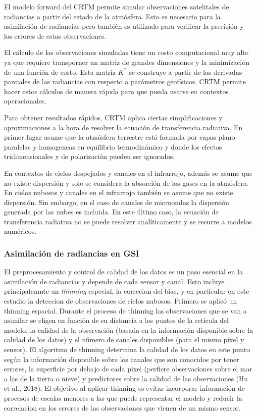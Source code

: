 \documentclass[12pt,oneside,a4paper]{reedthesis}
\begin{document}
El modelo forward del CRTM permite simular observaciones satelitales de radiancias a partir del estado de la atmósfera. Esto es necesario para la asimilación de radiancias pero también es utilizado para verificar la precisión y los errores de estas observaciones.

El cálculo de las observaciones simuladas tiene un costo computacional muy alto ya que requiere transporner un matriz de grandes dimensiones y la minimización de una función de costo. Esta matriz \(K^{*}\) se construye a partir de las derivadas parciales de las radiancias con respecto a parámetros geofísicos. CRTM permite hacer estos cálculos de manera rápida para que pueda usarse en contextos operacionales.

Para obtener resultados rápidos, CRTM aplica ciertas simplificaciones y aproximaciones a la hora de resolver la ecuación de transferencia radiativa. En primer lugar asume que la atmósfera terrestre está formada por capas plano-paralelas y homogeneas en equilibrio termodinámico y donde los efectos tridimensionales y de polarización pueden ser ignorados.

En contextos de cielos despejados y canales en el infrarrojo, además se asume que no existe dispersión y solo se considera la absorción de los gases en la atmósfera. En cielos nubosos y canales en el infrarrojo también se asume que no existe dispersión. Sin embargo, en el caso de canales de microondas la dispersión generada por las nubes es incluida. En este último caso, la ecuación de transferencia radiativa no se puede resolver analíticamente y se recurre a modelos numéricos.

\hypertarget{sat}{%
\subsubsection{Asimilación de radiancias en GSI}\label{sat}}

El preprocesamiento y control de calidad de los datos es un paso esencial en la asimilación de radiancias y depende de cada sensor y canal. Esto incluye principalemnte un \emph{thinning} especial, la correcion del bias, y en particular en este estudio la deteccion de observaciones de cielos nubosos. Primero se aplicó un thinning espacial. Durante el proceso de thinning las observaciones que se van a asimilar se eligen en función de su distancia a los puntos de la retícula del modelo, la calidad de la observación (basada en la información disponible sobre la calidad de los datos) y el número de canales disponibles (para el mismo píxel y sensor). El algoritmo de thinning determina la calidad de los datos en este punto según la información disponible sobre los canales que son conocidos por tener errores, la superficie por debajo de cada pixel (perfiere observaciones sobre el mar a las de la tierra o nieve) y predictores sobre la calidad de las observaciones (Hu et al., 2018). El objetivo al aplicar thinning es evitar incorporar información de procesos de escalas menores a las que puede representar el modelo y reducir la correlacion en los errores de las observaciones que vienen de un mismo sensor.
\end{document}
